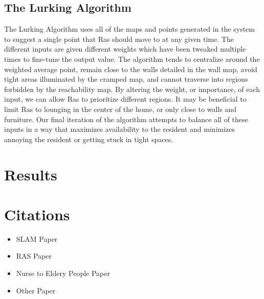 \documentclass[11pt, conference, a4paper]{IEEEtran}
\begin{document}
\subsection{The Lurking Algorithm}
The Lurking Algorithm uses all of the maps and points generated in the system to suggest a single point that Ras should move to at any given time. The different inputs are given different weights which have been tweaked multiple times to fine-tune the output value. The algorithm tends to centralize around the weighted average point, remain close to the walls detailed in the wall map, avoid tight areas illuminated by the cramped map, and cannot traverse into regions forbidden by the reachability map. By altering the weight, or importance, of each input, we can allow Ras to prioritize different regions. It may be beneficial to limit Ras to lounging in the center of the home, or only close to walls and furniture. Our final iteration of the algorithm attempts to balance all of these inputs in a way that maximizes availability to the resident and minimizes annoying the resident or getting stuck in tight spaces. 

\section{Results}


\section{Citations}
\begin{itemize}
    \item SLAM Paper
    \item RAS Paper
    \item Nurse to Eldery People Paper
    \item Other Paper
\end{itemize}
\end{document}
